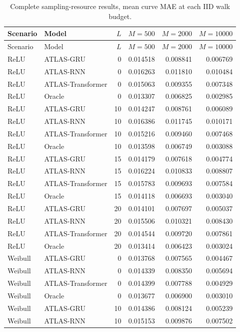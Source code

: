 \begin{longtable}{llrrrr}
\caption{Complete sampling-resource results, mean curve MAE at each IID walk budget.}\label{tab:budgetall}\\
\toprule Scenario & Model & $L$ & $M=500$ & $M=2000$ & $M=10000$\\\midrule\endfirsthead
\toprule Scenario & Model & $L$ & $M=500$ & $M=2000$ & $M=10000$\\\midrule\endhead
ReLU & ATLAS-GRU & 0 & 0.014518 & 0.008841 & 0.006769 \\
ReLU & ATLAS-RNN & 0 & 0.016263 & 0.011810 & 0.010484 \\
ReLU & ATLAS-Transformer & 0 & 0.015063 & 0.009355 & 0.007348 \\
ReLU & Oracle & 0 & 0.013307 & 0.006825 & 0.002985 \\
ReLU & ATLAS-GRU & 10 & 0.014247 & 0.008761 & 0.006089 \\
ReLU & ATLAS-RNN & 10 & 0.016386 & 0.011745 & 0.010171 \\
ReLU & ATLAS-Transformer & 10 & 0.015216 & 0.009460 & 0.007468 \\
ReLU & Oracle & 10 & 0.013598 & 0.006749 & 0.003088 \\
ReLU & ATLAS-GRU & 15 & 0.014179 & 0.007618 & 0.004774 \\
ReLU & ATLAS-RNN & 15 & 0.016224 & 0.010833 & 0.008807 \\
ReLU & ATLAS-Transformer & 15 & 0.015783 & 0.009693 & 0.007584 \\
ReLU & Oracle & 15 & 0.014118 & 0.006693 & 0.003040 \\
ReLU & ATLAS-GRU & 20 & 0.014101 & 0.007697 & 0.005037 \\
ReLU & ATLAS-RNN & 20 & 0.015506 & 0.010321 & 0.008430 \\
ReLU & ATLAS-Transformer & 20 & 0.014544 & 0.009720 & 0.007861 \\
ReLU & Oracle & 20 & 0.013414 & 0.006423 & 0.003024 \\
Weibull & ATLAS-GRU & 0 & 0.013768 & 0.007565 & 0.004467 \\
Weibull & ATLAS-RNN & 0 & 0.014339 & 0.008350 & 0.005694 \\
Weibull & ATLAS-Transformer & 0 & 0.014399 & 0.007788 & 0.004929 \\
Weibull & Oracle & 0 & 0.013677 & 0.006900 & 0.003010 \\
Weibull & ATLAS-GRU & 10 & 0.014386 & 0.008124 & 0.005239 \\
Weibull & ATLAS-RNN & 10 & 0.015153 & 0.009876 & 0.007502 \\

\end{longtable}
